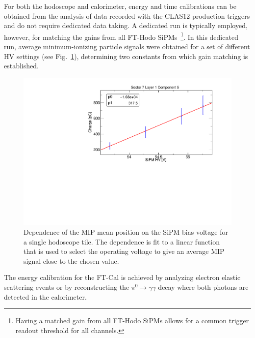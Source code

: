 For both the hodoscope and calorimeter, energy and time calibrations can be obtained from the analysis of data
recorded with the CLAS12 production triggers and do not require dedicated data taking. A dedicated run is
typically employed, however, for matching the gains from all FT-Hodo SiPMs~\footnote{Having a matched gain
from all FT-Hodo SiPMs allows for a common trigger readout threshold for all channels.}. In this dedicated run,
average minimum-ionizing particle signals were obtained for a set of different HV settings (see
Fig.~\ref{fig:fthodo_gainmatch}), determining two constants from which gain matching is established.

\begin{figure}
\includegraphics[width=1.0\columnwidth]{fig/fthodo_gainmatch.pdf}
\caption{Dependence of the MIP mean position on the SiPM bias voltage for a single hodoscope tile. The dependence
  is fit to a linear function that is used to select the operating voltage to give an average MIP signal close to the chosen
  value.}
\label{fig:fthodo_gainmatch}
\end{figure}

The energy calibration for the FT-Cal is achieved by analyzing electron elastic scattering events or by reconstructing
the $\pi^0\to\gamma\gamma$ decay where both photons are detected in the calorimeter. 

